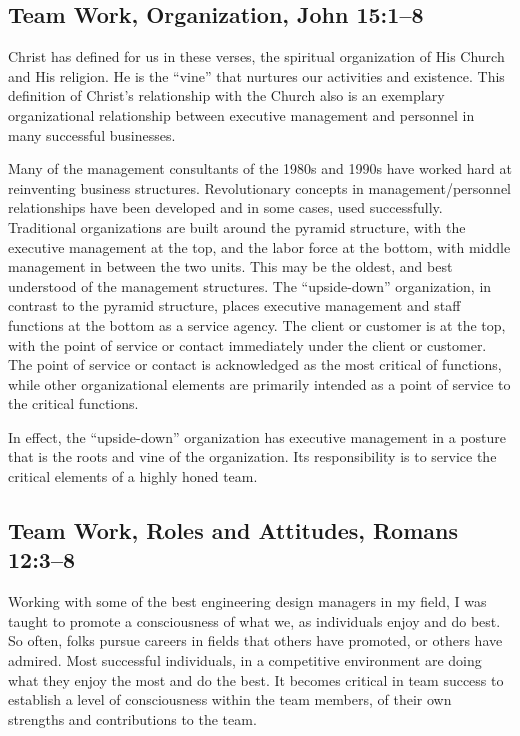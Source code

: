 \documentclass[12pt]{memoir}
\begin{document}
\subsection[Team Work, Organization]{Team Work, Organization, John 15:1--8}

Christ has defined for us in these verses, the spiritual organization
of His Church and His religion. He is the ``vine'' that nurtures
our activities and existence. This definition of Christ's relationship
with the Church also is an exemplary organizational relationship
between executive management and personnel in many successful businesses.

Many of the management consultants of the 1980s and 1990s have worked hard at reinventing business structures. Revolutionary concepts in management\slash{}personnel relationships have been developed and in some
cases, used successfully. Traditional organizations are built around
the pyramid structure, with the executive management at the top, and
the labor force at the bottom, with middle management in between the
two units. This may be the oldest, and best understood of the management
structures. The ``upside-down'' organization, in contrast to the
pyramid structure, places executive management and staff functions
at the bottom as a service agency. The client or customer is at the
top, with the point of service or contact immediately under the client
or customer. The point of service or contact is acknowledged as the
most critical of functions, while other organizational elements are
primarily intended as a point of service to the critical functions.

In effect, the ``upside-down'' organization has executive management
in a posture that is the roots and vine of the organization. Its
responsibility is to service the critical elements of a highly honed
team.

\subsection[Team Work, Roles and Attitudes]{Team Work, Roles and Attitudes, Romans 12:3--8}

Working with some of the best engineering design managers in my field, I was taught to promote a consciousness of what we, as individuals enjoy and do best. So often, folks pursue careers in fields that others have promoted, or others have admired. Most successful individuals, in a competitive environment are doing what they enjoy the most and do the best. It becomes critical in team success to establish a level of consciousness within the team members, of their own strengths and contributions to the team.
\end{document}
